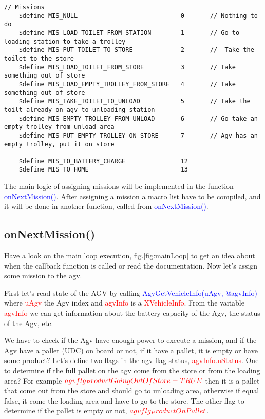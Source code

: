 \begin{lstlisting}[caption= Agv Missions, label=lstStoreMissions]
	// Missions
	$define MIS_NULL							0		// Nothing to do
	$define MIS_LOAD_TOILET_FROM_STATION		1		// Go to loading station to take a trolley
	$define MIS_PUT_TOILET_TO_STORE				2		//  Take the toilet to the store
	$define MIS_LOAD_TOILET_FROM_STORE			3		// Take something out of store
	$define MIS_LOAD_EMPTY_TROLLEY_FROM_STORE	4		// Take something out of store
	$define MIS_TAKE_TOILET_TO_UNLOAD			5		// Take the toilt already on agv to unloading station
	$define MIS_EMPTY_TROLLEY_FROM_UNLOAD		6		// Go take an empty trolley from unload area
	$define MIS_PUT_EMPTY_TROLLEY_ON_STORE		7		// Agv has an empty trolley, put it on store
	
	$define MIS_TO_BATTERY_CHARGE				12
	$define MIS_TO_HOME							13
\end{lstlisting}

The main logic of assigning missions will be implemented in the function \textcolor{blue}{onNextMission()}. After assigning a mission a macro list have to be compiled, and it will be done in another function, called from \textcolor{blue}{onNextMission()}.

\subsection{onNextMission()}
Have a look on the main loop execution, fig.\ref{fig:mainLoop} to get an idea about when the callback function is called or read the documentation. Now let's assign some mission to the agv.

First let's read state of the AGV by calling \textcolor{blue}{AgvGetVehicleInfo(uAgv, @agvInfo)} where \textcolor{red}{uAgv} the Agv index and \textcolor{red}{agvInfo} is a \textcolor{red}{XVehicleInfo}. From the variable \textcolor{red}{agvInfo} we can get information about the battery capacity of the Agv, the status of the Agv, etc.

We have to check if the Agv have enough power to execute a mission, and if the Agv have a pallet (UDC) on board or not, if it have a pallet, it is empty or have some product?
Let's define two flags in the agv flag status, \textcolor{red}{agvInfo.uStatus}. One to determine if the full pallet on the agv come from the store or from the loading area? For example $\textcolor{red}{agvflg_ProductGoingOutOfStore=TRUE}$ then it is a pallet that come out from the store and should go to unloading area, otherwise if equal false, it come the loading area and have to go to the store.
The other flag to determine if the pallet is empty or not, $\textcolor{red}{agvflg_ProductOnPallet}$.

